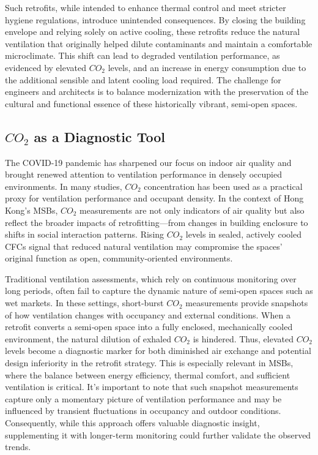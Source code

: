 \documentclass[preprint,12pt]{elsarticle}
\begin{document}
    Such retrofits, while intended to enhance thermal control and meet stricter hygiene regulations, introduce unintended consequences. By closing the building envelope and relying solely on active cooling, these retrofits reduce the natural ventilation that originally helped dilute contaminants and maintain a comfortable microclimate\cite{4,5}. This shift can lead to degraded ventilation performance, as evidenced by elevated $CO_2$ levels, and an increase in energy consumption due to the additional sensible and latent cooling load required. The challenge for engineers and architects is to balance modernization with the preservation of the cultural and functional essence of these historically vibrant, semi‐open spaces.

\subsection{$CO_2$ as a Diagnostic Tool}
    The COVID-19 pandemic has sharpened our focus on indoor air quality and brought renewed attention to ventilation performance in densely occupied environments. In many studies, $CO_2$ concentration has been used as a practical proxy for ventilation performance and occupant density\cite{17}. In the context of Hong Kong’s MSBs, $CO_2$ measurements are not only indicators of air quality but also reflect the broader impacts of retrofitting—from changes in building enclosure to shifts in social interaction patterns. Rising $CO_2$ levels in sealed, actively cooled CFCs signal that reduced natural ventilation may compromise the spaces’ original function as open, community-oriented environments\cite{8,15}.
    
    Traditional ventilation assessments, which rely on continuous monitoring over long periods, often fail to capture the dynamic nature of semi‑open spaces such as wet markets. In these settings, short‐burst $CO_2$ measurements provide snapshots of how ventilation changes with occupancy and external conditions. When a retrofit converts a semi‑open space into a fully enclosed, mechanically cooled environment, the natural dilution of exhaled $CO_2$ is hindered. Thus, elevated $CO_2$ levels become a diagnostic marker for both diminished air exchange and potential design inferiority in the retrofit strategy\cite{16}. This is especially relevant in MSBs, where the balance between energy efficiency, thermal comfort, and sufficient ventilation is critical. It's important to note that such snapshot measurements capture only a momentary picture of ventilation performance and may be influenced by transient fluctuations in occupancy and outdoor conditions. Consequently, while this approach offers valuable diagnostic insight, supplementing it with longer-term monitoring could further validate the observed trends.
    
\end{document}
